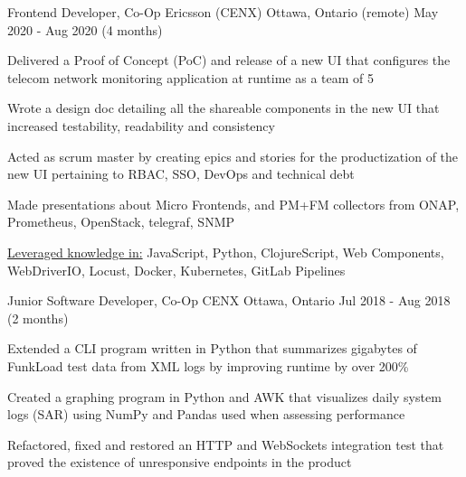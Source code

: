 \begin{cventries}
{\begin{cvitems}
		\end{cvitems}
	}
	\cventry
	{Frontend Developer, Co-Op}
	{Ericsson (CENX)}
	{Ottawa, Ontario (remote)}
	{May 2020 - Aug 2020 (4 months)}
	{
		\begin{cvitems}
			\item{Delivered a Proof of Concept (PoC) and release of a new UI that configures the telecom network monitoring application at runtime as a team of 5}
			\item{Wrote a design doc detailing all the shareable components in the new UI that increased testability, readability and consistency}
			\item{Acted as scrum master by creating epics and stories for the productization of the new UI pertaining to RBAC, SSO, DevOps and technical debt}
			\item{Made presentations about Micro Frontends, and PM+FM collectors from ONAP, Prometheus, OpenStack, telegraf, SNMP}
			\item{\underline{Leveraged knowledge in:} JavaScript, Python, ClojureScript, Web Components, WebDriverIO, Locust, Docker, Kubernetes, GitLab Pipelines}
		\end{cvitems}
	}
	\cventry
	{Junior Software Developer, Co-Op}
	{CENX}
	{Ottawa, Ontario}
	{Jul 2018 - Aug 2018 (2 months)}
	{
		\begin{cvitems}
			\item{Extended a CLI program written in Python that summarizes gigabytes of FunkLoad test data from XML logs by improving runtime by over 200\%}
			\item{Created a graphing program in Python and AWK that visualizes daily system logs (SAR) using NumPy and Pandas used when assessing performance}
			\item{Refactored, fixed and restored an HTTP and WebSockets integration test that proved the existence of unresponsive endpoints in the product}
		\end{cvitems}
	}
\end{cventries}

